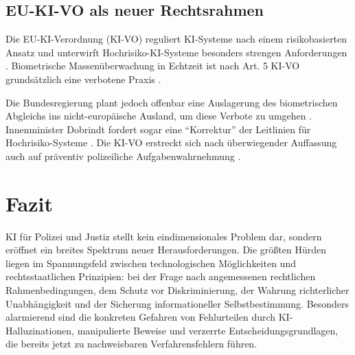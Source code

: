 \documentclass[12pt,a4paper]{article}
\begin{document}
	\subsection{EU-KI-VO als neuer Rechtsrahmen}
	
	Die EU-KI-Verordnung (KI-VO) reguliert KI-Systeme nach einem risikobasierten Ansatz und unterwirft Hochrisiko-KI-Systeme besonders strengen Anforderungen \cite{Kriminalpolizei2026}. Biometrische Massenüberwachung in Echtzeit ist nach Art. 5 KI-VO grundsätzlich eine verbotene Praxis \cite{RAV2025}.
	
	Die Bundesregierung plant jedoch offenbar eine Auslagerung des biometrischen Abgleichs ins nicht-europäische Ausland, um diese Verbote zu umgehen \cite{Gruene2026}. Innenminister Dobrindt fordert sogar eine \enquote{Korrektur} der Leitlinien für Hochrisiko-Systeme \cite{Dobrindt2026}. Die KI-VO erstreckt sich nach überwiegender Auffassung auch auf präventiv polizeiliche Aufgabenwahrnehmung \cite{Kriminalpolizei2026}.
	
	\section{Fazit}
	
	KI für Polizei und Justiz stellt kein eindimensionales Problem dar, sondern eröffnet ein breites Spektrum neuer Herausforderungen. Die größten Hürden liegen im Spannungsfeld zwischen technologischen Möglichkeiten und rechtsstaatlichen Prinzipien: bei der Frage nach angemessenen rechtlichen Rahmenbedingungen, dem Schutz vor Diskriminierung, der Wahrung richterlicher Unabhängigkeit und der Sicherung informationeller Selbstbestimmung. Besonders alarmierend sind die konkreten Gefahren von Fehlurteilen durch KI-Halluzinationen, manipulierte Beweise und verzerrte Entscheidungsgrundlagen, die bereits jetzt zu nachweisbaren Verfahrensfehlern führen.
	
\end{document}
